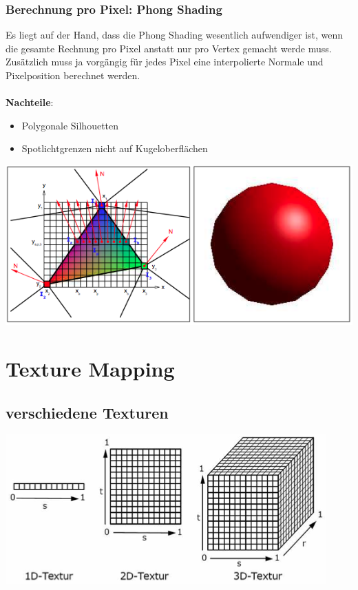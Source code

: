 \documentclass[10pt]{article}
\begin{document}
\subsubsection{Berechnung pro Pixel: Phong Shading}
Es liegt auf der Hand, dass die Phong Shading wesentlich aufwendiger ist, wenn die gesamte Rechnung pro Pixel anstatt nur pro Vertex gemacht werde muss. Zusätzlich muss ja vorgängig für jedes Pixel eine interpolierte Normale und Pixelposition berechnet werden. \\
\\
\textbf{Nachteile}:
\begin{itemize}
	\item Polygonale Silhouetten
	\item Spotlichtgrenzen nicht auf Kugeloberflächen
\end{itemize}
\begin{center}
	\includegraphics[scale=0.4]{phong_shading.png}
\end{center}

\newpage
\section{Texture Mapping}
\subsection{verschiedene Texturen}
\begin{center}
	\includegraphics[scale=0.4]{texturen.png}
\end{center}
\end{document}
